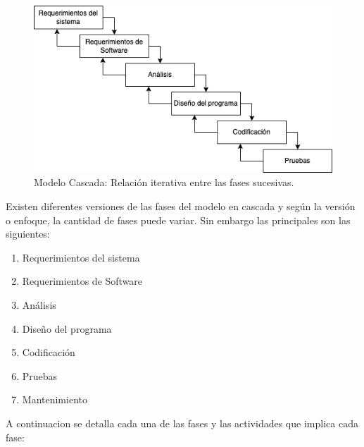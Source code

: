 \begin{figure}[H]
    \begin{center}
        \includegraphics[width=12cm]{img/capitulo_2/cascada_iterativa.png}
    \end{center}
    \caption{Modelo Cascada: Relación iterativa entre las fases sucesivas.}
    \label{fig:cascada_iterativa}
\end{figure}

Existen diferentes versiones de las fases del modelo en cascada y según la versión o enfoque, la cantidad de fases puede variar. Sin embargo las principales son las siguientes:

\begin{enumerate}
    \item Requerimientos del sistema
    \item Requerimientos de Software
    \item Análisis
    \item Diseño del programa
    \item Codificación
    \item Pruebas
    \item Mantenimiento 
\end{enumerate}

A continuacion se detalla cada una de las fases y las actividades que implica cada fase:
